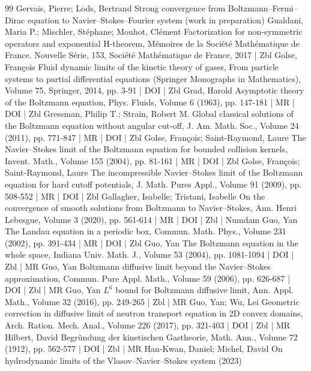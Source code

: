 \begin{thebibliography}{99}
 Gervais, Pierre; Lods, Bertrand Strong convergence from Boltzmann–Fermi–Dirac equation to Navier–Stokes–Fourier system (work in preparation)
 Gualdani, Maria P.; Mischler, Stéphane; Mouhot, Clément Factorization for non-symmetric operators and exponential H-theorem, Mémoires de la Société Mathématique de France. Nouvelle Série, 153, Société Mathématique de France, 2017 | Zbl
 Golse, François Fluid dynamic limits of the kinetic theory of gases, From particle systems to partial differential equations (Springer Monographs in Mathematics), Volume 75, Springer, 2014, pp. 3-91 | DOI | Zbl
 Grad, Harold Asymptotic theory of the Boltzmann equation, Phys. Fluids, Volume 6 (1963), pp. 147-181 | MR | DOI | Zbl
 Gressman, Philip T.; Strain, Robert M. Global classical solutions of the Boltzmann equation without angular cut-off, J. Am. Math. Soc., Volume 24 (2011), pp. 771-847 | MR | DOI | Zbl
 Golse, François; Saint-Raymond, Laure The Navier–Stokes limit of the Boltzmann equation for bounded collision kernels, Invent. Math., Volume 155 (2004), pp. 81-161 | MR | DOI | Zbl
 Golse, François; Saint-Raymond, Laure The incompressible Navier–Stokes limit of the Boltzmann equation for hard cutoff potentials, J. Math. Pures Appl., Volume 91 (2009), pp. 508-552 | MR | DOI | Zbl
 Gallagher, Isabelle; Tristani, Isabelle On the convergence of smooth solutions from Boltzmann to Navier–Stokes, Ann. Henri Lebesgue, Volume 3 (2020), pp. 561-614 | MR | DOI | Zbl | Numdam
 Guo, Yan The Landau equation in a periodic box, Commun. Math. Phys., Volume 231 (2002), pp. 391-434 | MR | DOI | Zbl
 Guo, Yan The Boltzmann equation in the whole space, Indiana Univ. Math. J., Volume 53 (2004), pp. 1081-1094 | DOI | Zbl | MR
 Guo, Yan Boltzmann diffusive limit beyond the Navier–Stokes approximation, Commun. Pure Appl. Math., Volume 59 (2006), pp. 626-687 | DOI | Zbl | MR
 Guo, Yan ${L}^{6}$ bound for Boltzmann diffusive limit, Ann. Appl. Math., Volume 32 (2016), pp. 249-265 | Zbl | MR
 Guo, Yan; Wu, Lei Geometric correction in diffusive limit of neutron transport equation in 2D convex domains, Arch. Ration. Mech. Anal., Volume 226 (2017), pp. 321-403 | DOI | Zbl | MR
 Hilbert, David Begründung der kinetischen Gastheorie, Math. Ann., Volume 72 (1912), pp. 562-577 | DOI | Zbl | MR
 Han-Kwan, Daniel; Michel, David On hydrodynamic limits of the Vlasov–Navier–Stokes system (2023)

\end{thebibliography}
